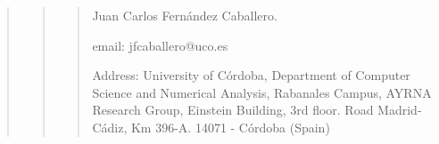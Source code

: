 \begin{quote}
\begin{quote}
        \vspace{0.50cm}
        
        \begin{quote}
			Juan Carlos Fernández Caballero.

			email: jfcaballero@uco.es

			Address: University of Córdoba, Department of Computer Science and Numerical Analysis, Rabanales Campus, AYRNA Research Group, Einstein Building, 3rd floor. Road Madrid-Cádiz, Km 396-A. 14071 - Córdoba (Spain)
		\end{quote}

	\end{quote}

\end{quote}










